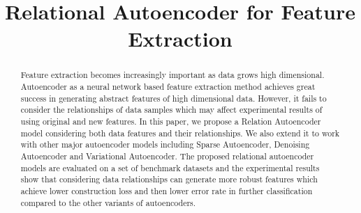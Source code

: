 \documentclass[conference]{IEEEtran}
\begin{document}
	
	\title{Relational Autoencoder for Feature Extraction}
	
	\author{
	}
	
\maketitle
	
\begin{abstract}
		Feature extraction becomes increasingly important as data grows high dimensional. Autoencoder as a neural network based feature extraction method achieves great success in generating abstract features of high dimensional data. However, it fails to consider the relationships of data samples which may affect experimental results of using original and new features. In this paper, we propose a Relation Autoencoder model considering both data features and their relationships. We also extend it to work with other major autoencoder models including Sparse Autoencoder, Denoising Autoencoder and Variational Autoencoder. The proposed relational autoencoder models are evaluated on a set of benchmark datasets and the experimental results show that considering data relationships can generate more robust features which achieve lower construction loss and then lower error rate in further classification compared to the other variants of autoencoders.
	\end{abstract}
	

\IEEEpeerreviewmaketitle
	
\end{document}

